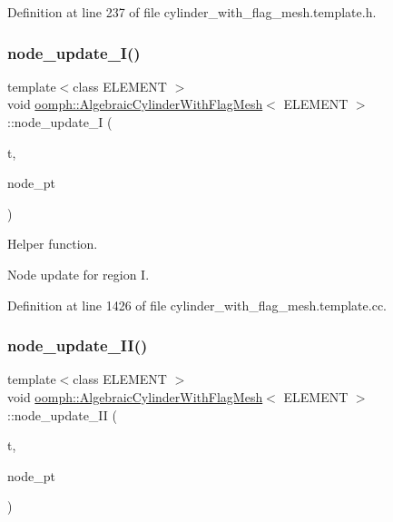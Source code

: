 Definition at line 237 of file cylinder\+\_\+with\+\_\+flag\+\_\+mesh.\+template.\+h.

\mbox{\label{classoomph_1_1AlgebraicCylinderWithFlagMesh_a713cf7c2e1be91eae2667dc3e1fd8644}} 
\subsubsection{\texorpdfstring{node\+\_\+update\+\_\+\+I()}{node\_update\_I()}}
{\footnotesize\ttfamily template$<$class E\+L\+E\+M\+E\+NT $>$ \\
void \hyperlink{classoomph_1_1AlgebraicCylinderWithFlagMesh}{oomph\+::\+Algebraic\+Cylinder\+With\+Flag\+Mesh}$<$ E\+L\+E\+M\+E\+NT $>$\+::node\+\_\+update\+\_\+I (\begin{DoxyParamCaption}\item[{const unsigned \&}]{t,  }\item[{Algebraic\+Node $\ast$\&}]{node\+\_\+pt }\end{DoxyParamCaption})\hspace{0.3cm}{\ttfamily [protected]}}



Helper function. 

Node update for region I. 

Definition at line 1426 of file cylinder\+\_\+with\+\_\+flag\+\_\+mesh.\+template.\+cc.

\mbox{\label{classoomph_1_1AlgebraicCylinderWithFlagMesh_a2717b4ae70a9641c24becc8176410b3e}} 
\subsubsection{\texorpdfstring{node\+\_\+update\+\_\+\+I\+I()}{node\_update\_II()}}
{\footnotesize\ttfamily template$<$class E\+L\+E\+M\+E\+NT $>$ \\
void \hyperlink{classoomph_1_1AlgebraicCylinderWithFlagMesh}{oomph\+::\+Algebraic\+Cylinder\+With\+Flag\+Mesh}$<$ E\+L\+E\+M\+E\+NT $>$\+::node\+\_\+update\+\_\+\+II (\begin{DoxyParamCaption}\item[{const unsigned \&}]{t,  }\item[{Algebraic\+Node $\ast$\&}]{node\+\_\+pt }\end{DoxyParamCaption})\hspace{0.3cm}{\ttfamily [protected]}}



